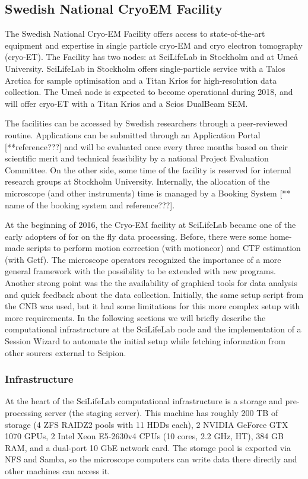 
\subsection{Swedish National CryoEM Facility}

The Swedish National Cryo-EM Facility offers access to state-of-the-art equipment and expertise 
in single particle cryo-EM and cryo electron tomography (cryo-ET). The Facility has two nodes: at SciLifeLab 
in Stockholm and at Umeå University. SciLifeLab in Stockholm offers single-particle service with a 
Talos Arctica for sample optimisation and a Titan Krios for high-resolution data collection. 
The Umeå node is expected to become operational during 2018, and will offer cryo-ET with a 
Titan Krios and a Scios DualBeam SEM.

The facilities can be accessed by Swedish researchers through a peer-reviewed routine. Applications can be 
submitted through an Application Portal [**reference???] and will be evaluated once every three months based on their 
scientific merit and technical feasibility by a national Project Evaluation Committee. On the other side, 
some time of the facility is reserved for internal research groups at Stockholm University. Internally, the allocation
of the microscope (and other instruments) time is managed by a Booking System [** name of the booking system and reference???]. 


At the beginning of 2016, the Cryo-EM facility at SciLifeLab became one of the early adopters of \scipion 
for on the fly data processing. Before, there were some home-made scripts to perform motion correction (with motioncor)
and CTF estimation (with Gctf). The microscope operators recognized the importance of  
a more general framework with the possibility to be extended with new programs. Another strong point was the 
the availability of graphical tools for data analysis and quick feedback about the data collection. Initially, the 
same setup script from the CNB was used, but it had some limitations for this more complex setup with more 
requirements. In the following sections we will briefly describe the computational infrastructure at the
SciLifeLab node and the implementation of a Session Wizard to automate the initial setup while fetching 
information from other sources external to Scipion. 


\subsubsection{Infrastructure}
At the heart of the SciLifeLab computational infrastructure is a storage and pre-processing server (the
staging server). This machine has roughly 200 TB of storage (4 ZFS RAIDZ2 pools
with 11 HDDs each), 2 NVIDIA GeForce GTX 1070 GPUs, 2 Intel Xeon E5-2630v4 CPUs
(10 cores, 2.2 GHz, HT), 384 GB RAM, and a dual-port 10 GbE network card. The
storage pool is exported via NFS and Samba, so the microscope computers can
write data there directly and other machines can access it.

